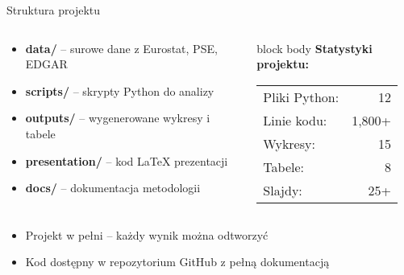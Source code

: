 \begin{frame}{Struktura projektu}
    \begin{columns}[T]
        \begin{column}{0.6\textwidth}
            \begin{itemize}
                \item \textbf{data/} -- surowe dane z Eurostat, PSE, EDGAR
                \item \textbf{scripts/} -- skrypty Python do analizy
                \item \textbf{outputs/} -- wygenerowane wykresy i tabele
                \item \textbf{presentation/} -- kod LaTeX prezentacji
                \item \textbf{docs/} -- dokumentacja metodologii
            \end{itemize}
        \end{column}

        \begin{column}{0.4\textwidth}
            \begin{beamercolorbox}[rounded=true, shadow=false, sep=8pt]{block body}
                \textbf{Statystyki projektu:}
                \vspace{0.2cm}
                
                \begin{tabular}{lr}
                    Pliki Python: & 12 \\
                    Linie kodu: & 1,800+ \\
                    Wykresy: & 15 \\
                    Tabele: & 8 \\
                    Slajdy: & 25+ \\
                \end{tabular}
            \end{beamercolorbox}
        \end{column}
    \end{columns}
    
    \vspace{0.3cm}
    
    \begin{itemize}
        \item Projekt w pełni  -- każdy wynik można odtworzyć
        \item Kod dostępny w repozytorium GitHub z pełną dokumentacją
    \end{itemize}
\end{frame}